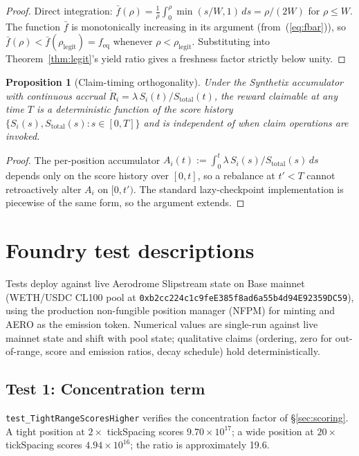 \documentclass[11pt,a4paper]{article}
\theoremstyle{definition}
\theoremstyle{plain}
\newtheorem{proposition}{Proposition}
\theoremstyle{remark}
\begin{document}
\begin{proof}
Direct integration: $\bar f(\rho) = \frac{1}{\rho}\int_0^\rho \min(s/W, 1)\,ds = \rho/(2W)$ for $\rho \leq W$. The function $\bar f$ is monotonically increasing in its argument (from~(\ref{eq:fbar})), so $\bar f(\rho) < \bar f(\rho_{\text{legit}}) = f_{\text{eq}}$ whenever $\rho < \rho_{\text{legit}}$. Substituting into Theorem~\ref{thm:legit}'s yield ratio gives a freshness factor strictly below unity.
\end{proof}

\begin{proposition}[Claim-timing orthogonality]\label{prop:claim-timing}
Under the Synthetix accumulator with continuous accrual $\dot R_i = \lambda\,S_i(t)/S_{\text{total}}(t)$, the reward claimable at any time $T$ is a deterministic function of the score history $\{S_i(s), S_{\text{total}}(s) : s \in [0, T]\}$ and is independent of when claim operations are invoked.
\end{proposition}

\begin{proof}
The per-position accumulator $A_i(t) := \int_0^t \lambda\,S_i(s)/S_{\text{total}}(s)\,ds$ depends only on the score history over $[0, t]$, so a rebalance at $t' < T$ cannot retroactively alter $A_i$ on $[0, t')$. The standard lazy-checkpoint implementation is piecewise of the same form, so the argument extends.
\end{proof}

\section{Foundry test descriptions}\label{app:forkmap}

Tests deploy against live Aerodrome Slipstream state on Base mainnet (WETH/USDC CL100 pool at \texttt{0xb2cc224c1c9feE385f8ad6a55b4d94E92359DC59}), using the production non-fungible position manager (NFPM) for minting and AERO as the emission token. Numerical values are single-run against live mainnet state and shift with pool state; qualitative claims (ordering, zero for out-of-range, score and emission ratios, decay schedule) hold deterministically.

\subsection*{Test 1: Concentration term}\label{app:test1}

\texttt{test\_TightRangeScoresHigher} verifies the concentration factor of \S\ref{sec:scoring}. A tight position at $2\times$ tickSpacing scores $9.70 \times 10^{17}$; a wide position at $20\times$ tickSpacing scores $4.94 \times 10^{16}$; the ratio is approximately 19.6.
\end{document}
